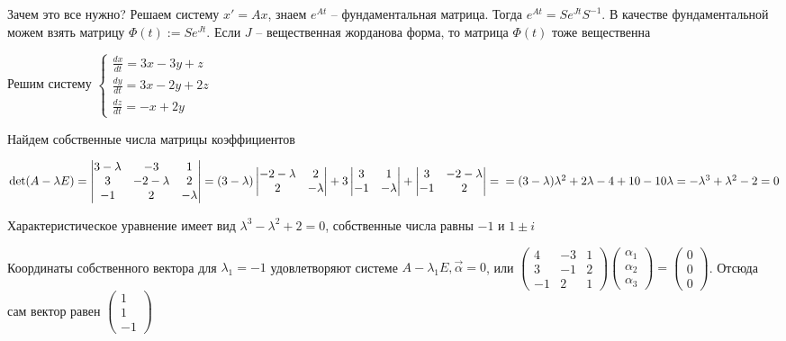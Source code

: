 \documentclass[12pt]{article}
\begin{document}
\begin{Remark}{Зачем это все нужно?}
    Решаем систему $x' = Ax$, знаем $e^{At}$ -- фундаментальная матрица. Тогда $e^{At} = Se^{Jt}S^{-1}$. В качестве фундаментальной можем взять матрицу $\Phi(t) := Se^{Jt}$. Если $J$ -- вещественная жорданова форма, то матрица $\Phi(t)$ тоже вещественна 
\end{Remark}

\begin{Example}{}
    Решим систему $\begin{cases}
        \frac{dx}{dt} = 3x - 3y + z \\
        \frac{dy}{dt} = 3x - 2y + 2z \\
        \frac{dz}{dt} = -x + 2y 
    \end{cases}$

    Найдем собственные числа матрицы коэффициентов

    $\det (A - \lambda E) = \begin{vmatrix}
        3 - \lambda & -3 & 1 \\
        3 & -2 - \lambda & 2 \\
        -1 & 2 & -\lambda
    \end{vmatrix} = (3 - \lambda) \begin{vmatrix}
        -2 - \lambda & 2 \\
        2 & -\lambda
    \end{vmatrix} + 3 \begin{vmatrix}
        3 & 1 \\
        -1 & -\lambda
    \end{vmatrix} + \begin{vmatrix}
        3 & -2 - \lambda \\
        -1 & 2
    \end{vmatrix} = \\ = (3 - \lambda)\lambda^2 + 2\lambda - 4 + 10 - 10\lambda = -\lambda^3 + \lambda^2 - 2 = 0$

    Характеристическое уравнение имеет вид $\lambda^3 - \lambda^2 + 2 = 0$, собственные числа равны $-1$ и $1 \pm i$

    Координаты собственного вектора для $\lambda_1 = -1$ удовлетворяют системе $A - \lambda_1E, \overrightarrow{\alpha} = 0$, или $\begin{pmatrix}
        4 & -3 & 1 \\
        3 & -1 & 2 \\
        -1 & 2 & 1
    \end{pmatrix} \begin{pmatrix}
        \alpha_1 \\
        \alpha_2 \\
        \alpha_3
    \end{pmatrix} = \begin{pmatrix}
        0 \\
        0 \\
        0
    \end{pmatrix}$. Отсюда сам вектор равен $\begin{pmatrix}
        1 \\
        1 \\
        -1
    \end{pmatrix}$


\end{Example}
\end{document}
